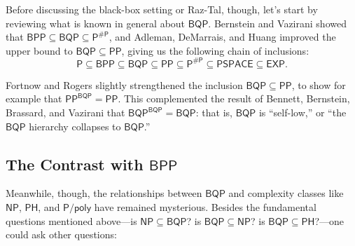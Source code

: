 \documentclass[11pt]{article}%
\begin{document}
Before discussing the black-box setting or Raz-Tal, though, let's
start by reviewing what is known in general about $\mathsf{BQP}$. Bernstein and Vazirani \cite{BV97} showed that $\mathsf{BPP} \subseteq \mathsf{BQP} \subseteq \mathsf{P^{\# P}}$, and Adleman, DeMarrais, and Huang \cite{ADH97} improved the upper bound to $\mathsf{BQP} \subseteq \mathsf{PP}$, giving us the following chain of inclusions:
\[
\mathsf{P} \subseteq \mathsf{BPP} \subseteq \mathsf{BQP} \subseteq \mathsf{PP} \subseteq \mathsf{P^{\# P}} \subseteq \mathsf{PSPACE} \subseteq \mathsf{EXP}.
\]

Fortnow and Rogers \cite{FR98} slightly strengthened the inclusion $\mathsf{BQP} \subseteq \mathsf{PP}$, to show for example that $\mathsf{PP^{BQP}} = \mathsf{PP}$.  This complemented the result of Bennett, Bernstein, Brassard, and Vazirani \cite{BBBV97} that $\mathsf{BQP^{BQP}} = \mathsf{BQP}$: that is, $\mathsf{BQP}$ is ``self-low,'' or ``the $\mathsf{BQP}$ hierarchy collapses to $\mathsf{BQP}$.''

\subsection{The Contrast with \texorpdfstring{$\mathsf{BPP}$}{BPP}}
\label{sec:contrast_with_bpp}

Meanwhile, though, the relationships between $\mathsf{BQP}$ and complexity classes like $\mathsf{NP}$, $\mathsf{PH}$, and $\mathsf{P/poly}$ have remained mysterious.  Besides the
fundamental questions mentioned above---is $\mathsf{NP} \subseteq \mathsf{BQP}$? is $\mathsf{BQP} \subseteq \mathsf{NP}$? is $\mathsf{BQP} \subseteq \mathsf{PH}$?---one could ask other questions:
\end{document}
